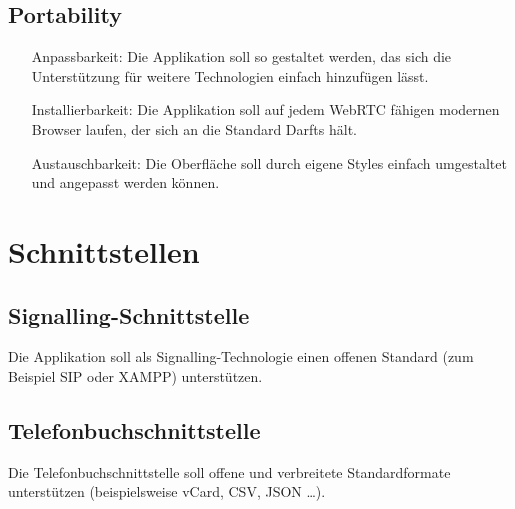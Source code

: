 
\subsection{Portability}
\begin{itemize}
	\item[Anpassbarkeit:] Die Applikation soll so gestaltet werden, das sich die Unterstützung für weitere Technologien einfach hinzufügen lässt.
	\item[Installierbarkeit:] Die Applikation soll auf jedem WebRTC fähigen modernen Browser laufen, der sich an die Standard Darfts hält.
	\item[Austauschbarkeit:] Die Oberfläche soll durch eigene Styles einfach umgestaltet und angepasst werden können.
\end{itemize}


\section{Schnittstellen}

\subsection{Signalling-Schnittstelle}
Die Applikation soll als Signalling-Technologie einen offenen Standard (zum
Beispiel SIP oder XAMPP) unterstützen.

\subsection{Telefonbuchschnittstelle}
Die Telefonbuchschnittstelle soll offene und verbreitete Standardformate
unterstützen (beispielsweise vCard, CSV, JSON …).
